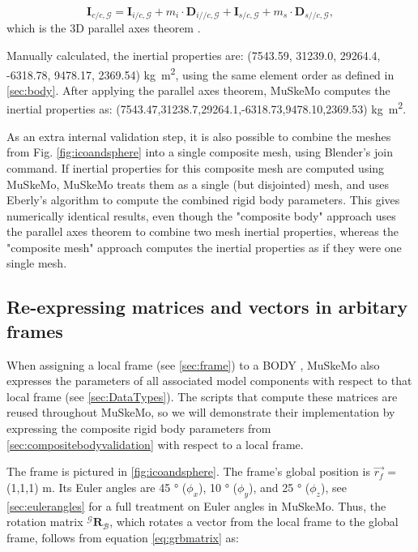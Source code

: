 \documentclass{article}
\begin{document}
\begin{equation}
\mathbf{I}_{c/c,{\mathcal{G}}} = \mathbf{I}_{i/c,{\mathcal{G}}} + m_i \cdot \mathbf{D}_{i//c,\mathcal{G}} +  \mathbf{I}_{s/c,{\mathcal{G}}} + m_s \cdot \mathbf{D}_{s//c,\mathcal{G}},
\end{equation}
which is the 3D parallel axes theorem \cite{valleryAdvancedDynamics2019,ruinaMechanicsToolsetStatics2019}.

Manually calculated, the inertial properties are:
(7543.59, 31239.0, 29264.4, -6318.78, 9478.17, 2369.54) \si{kg m^2}, using the same element order as defined in \ref{sec:body}. After applying the parallel axes theorem, MuSkeMo computes the inertial properties as: (7543.47,31238.7,29264.1,-6318.73,9478.10,2369.53) \si{kg m^2}.

As an extra internal validation step, it is also possible to combine the meshes from Fig. \ref{fig:icoandsphere} into a single composite mesh, using Blender's join command. If inertial properties for this composite mesh are computed using MuSkeMo, MuSkeMo treats them as a single (but disjointed) mesh, and uses Eberly's algorithm to compute the combined rigid body parameters. This gives numerically identical results, even though the "composite body" approach uses the parallel axes theorem to combine two mesh inertial properties, whereas the "composite mesh" approach computes the inertial properties as if they were one single mesh.

\subsection{Re-expressing matrices and vectors in arbitary frames}
\label{sec:framevalidation}
When assigning a local frame (see \ref{sec:frame}) to a BODY , MuSkeMo also expresses the parameters of all associated model components with respect to that local frame (see \ref{sec:DataTypes}). The scripts that compute these matrices are reused throughout MuSkeMo, so we will demonstrate their implementation by expressing the composite rigid body parameters from \ref{sec:compositebodyvalidation} with respect to a local frame.

The frame is pictured in \ref{fig:icoandsphere}. The frame's global position is \(\vec{r_f}\) = (1,1,1) \si{m}. Its Euler angles are 45 \si{\degree} (\( \phi_x \)), 10 \si{\degree} (\( \phi_y \)), and 25 \si{\degree} (\( \phi_z \)), see \ref{sec:eulerangles} for a full treatment on Euler angles in MuSkeMo. Thus, the rotation matrix \({}^{\mathcal{G}} \mathbf{R}_{\mathcal{B}}\), which rotates a vector from the local frame to the global frame, follows from equation \ref{eq:grbmatrix} as:
\end{document}
